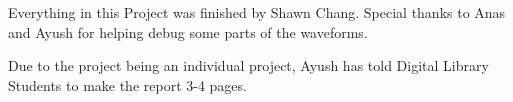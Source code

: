 Everything in this Project was finished by Shawn Chang. Special thanks to Anas and Ayush for helping debug some parts of the waveforms.

Due to the project being an individual project, Ayush has told Digital Library Students to make the report 3-4 pages.
